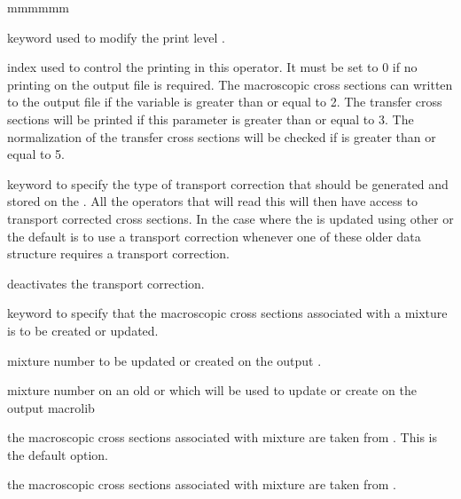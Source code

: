 \begin{ListeDeDescription}{mmmmmm}

\item[\moc{EDIT}] keyword used to modify the print level .

\item[\dusa{iprint}] index used to control the printing in this operator.
It must be set to 0 if no printing on the output file is required. The
macroscopic cross sections can written to the output file if the
variable  is greater than or equal to 2. The transfer cross
sections will be printed if this parameter is greater than or equal to 3. The
normalization of the transfer cross sections will be checked if 
is greater than or equal to 5.

\item[\moc{CTRA}] keyword to specify the type of transport correction that
should be generated and stored on the . All the operators that
will read this  will then have access to transport corrected
cross sections. In the case where the  is updated using other
 or  the default is to use a transport correction whenever one of these
older data structure requires a transport correction.

\item[\moc{OFF}] deactivates the transport correction.

\item[\moc{MIX}] keyword to specify that the macroscopic cross sections
associated with a mixture is to be created or updated.

\item[\dusa{numnew}] mixture number to be updated or created on the output
. 

\item[\dusa{numold}] mixture number on an old  or  which will be used
to update or create  on the output macrolib 

\item[\moc{OLDL}] the
macroscopic cross sections associated with mixture  are taken from . This is the
default option.

\item[\moc{UPDL}] the
macroscopic cross sections associated with mixture  are taken from .

\end{ListeDeDescription}

\eject
